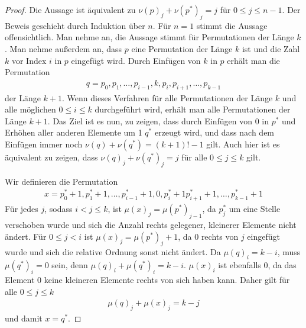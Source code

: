 \documentclass[a4paper, 10pt, ngerman]{article}
\begin{document}
\begin{proof}
    Die Aussage ist äquivalent zu $\nu(p)_j + \nu(p^*)_j = j$ für $0 \le j \le n - 1$. Der Beweis geschieht durch Induktion über $n$. Für $n = 1$ stimmt die Aussage offensichtlich. Man nehme an, die Aussage stimmt für Permutationen der Länge $k$. Man nehme außerdem an, dass $p$ eine Permutation der Länge $k$ ist und die Zahl $k$ vor Index $i$ in $p$ eingefügt wird. Durch Einfügen von $k$ in $p$ erhält man die Permutation
    \begin{align*}
        q = p_0, p_1, \dots, p_{i - 1}, k, p_i, p_{i + 1}, \dots, p_{k - 1}
    \end{align*}
    der Länge $k + 1$. Wenn dieses Verfahren für alle Permutationen der Länge $k$ und alle möglichen $0 \le i \le k$ durchgeführt wird, erhält man alle Permutationen der Länge $k + 1$. Das Ziel ist es nun, zu zeigen, dass durch Einfügen von 0 in $p^*$ und Erhöhen aller anderen Elemente um 1 $q^*$ erzeugt wird, und dass nach dem Einfügen immer noch $\nu(q) + \nu(q^*) = (k + 1)! - 1$ gilt. Auch hier ist es äquivalent zu zeigen, dass $\nu(q)_j + \nu(q^*)_j = j$ für alle $0 \le j \le k$ gilt.

    Wir definieren die Permutation
    \begin{align*}
        x = p^*_0 + 1, p^*_1 + 1, \dots, p^*_{i - 1} + 1, 0, p^*_i + 1 p^*_{i + 1} + 1, \dots, p^*_{k - 1} + 1
    \end{align*}
    Für jedes $j$, sodass $i < j \le k$, ist $\mu(x)_j = \mu(p^*)_{j - 1}$, da $p^*_j$ um eine Stelle verschoben wurde und sich die Anzahl rechts gelegener, kleinerer Elemente nicht ändert. Für $0 \le j < i$ ist $\mu(x)_j = \mu(p^*)_j + 1$, da 0 rechts von $j$ eingefügt wurde und sich die relative Ordnung sonst nicht ändert. Da $\mu(q)_i = k - i$, muss $\mu(q^*)_i = 0$ sein, denn $\mu(q)_i + \mu(q^*)_i = k - i$. $\mu(x)_i$ ist ebenfalls 0, da das Element 0 keine kleineren Elemente rechts von sich haben kann. Daher gilt für alle $0 \le j \le k$
    \begin{align*}
        \mu(q)_j + \mu(x)_j = k - j
    \end{align*}
    und damit $x = q^*$.
    

\end{proof}
\end{document}
